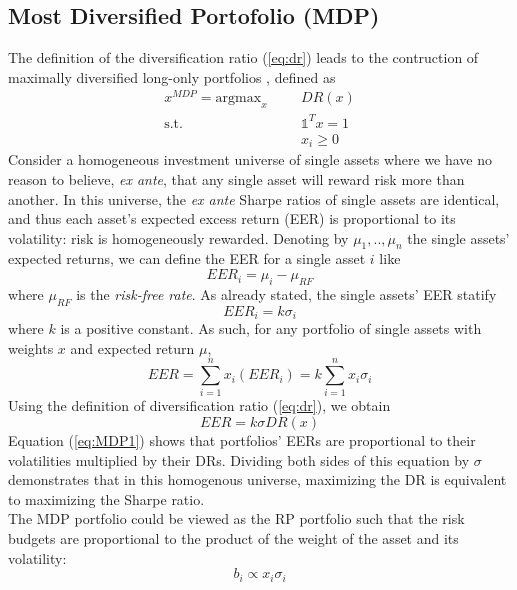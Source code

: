 \subsection{Most Diversified Portofolio (MDP)}
The definition of the diversification ratio (\ref{eq:dr}) leads to the contruction of maximally diversified long-only portfolios \cite{diversification}, defined as
\begin{equation}
\begin{aligned}
x^{MDP} = \mbox{argmax}_x &&&DR(x)\\
\text{s.t.}&&&\mathds{1}^T x = 1\\ 
&&&x_i \geq 0
\end{aligned}
\end{equation}
Consider a homogeneous investment universe of single assets where we have no reason to believe, \textit{ex ante}, that any single asset will reward risk more than another. In this universe, the \textit{ex ante} Sharpe ratios of single assets are identical, and thus each asset’s expected excess return (EER) is proportional to its volatility: risk is homogeneously rewarded. Denoting by $\mu_1,..,\mu_n$ the single assets' expected returns, we can define the EER for a single asset $i$ like
\begin{equation}
EER_i = \mu_i - \mu_{RF}
\end{equation}
where $\mu_{RF}$ is the \textit{risk-free rate}. As already stated, the single assets' EER statify
\begin{equation}
EER_i = k\sigma_i
\end{equation}
where $k$ is a positive constant. As such, for any portfolio of single assets with weights $x$ and expected return $\mu$,
\begin{equation}
EER = \sum_{i=1}^{n} x_i (EER_i) = k \sum_{i=1}^n x_i \sigma_i
\end{equation}
Using the definition of diversification ratio (\ref{eq:dr}), we obtain
\begin{equation}\label{eq:MDP1}
EER = k \sigma DR(x)
\end{equation}
Equation (\ref{eq:MDP1}) shows that portfolios’ EERs are proportional to their volatilities multiplied by their DRs. Dividing both sides of this equation by $\sigma$ demonstrates that in this homogenous universe, maximizing the DR is equivalent to maximizing the Sharpe ratio.\\
The MDP portfolio could be viewed as the RP portfolio such that the risk budgets are proportional to the product of the weight of the asset and its volatility\footnotemark[2]:
\begin{equation*}
b_i \propto x_i \sigma_i
\end{equation*}
